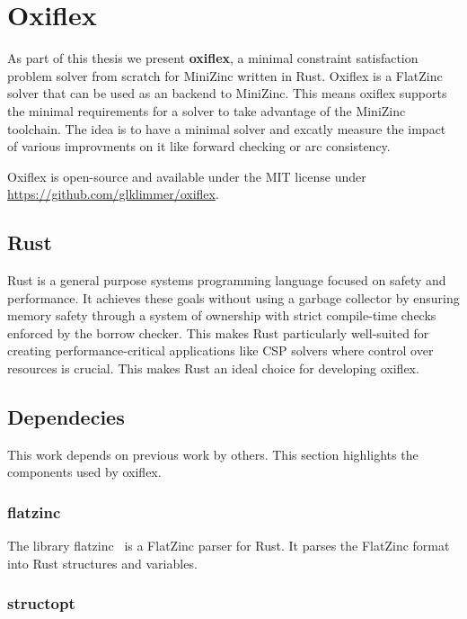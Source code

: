 \chapter{Oxiflex}

As part of this thesis we present \textbf{oxiflex}, a minimal constraint satisfaction problem solver from scratch for MiniZinc written in Rust. Oxiflex is a FlatZinc solver that can be used as an backend to MiniZinc. This means oxiflex supports the minimal requirements for a solver to take advantage of the MiniZinc toolchain. The idea is to have a minimal solver and excatly measure the impact of various improvments on it like forward checking or arc consistency.

Oxiflex is open-source and available under the MIT license under \url{https://github.com/glklimmer/oxiflex}.

\section{Rust}

Rust \cite{rust:2014} is a general purpose systems programming language focused on safety and performance. It achieves these goals without using a garbage collector by ensuring memory safety through a system of ownership with strict compile-time checks enforced by the borrow checker. This makes Rust particularly well-suited for creating performance-critical applications like CSP solvers where control over resources is crucial. This makes Rust an ideal choice for developing oxiflex.

\section{Dependecies}

This work depends on previous work by others. This section highlights the components used by oxiflex.

\subsection{flatzinc} \label{flatzinc}

The library flatzinc~\cite{flatzinc:2020} is a FlatZinc parser for Rust. It parses the FlatZinc format into Rust structures and variables.

\subsection{structopt}

